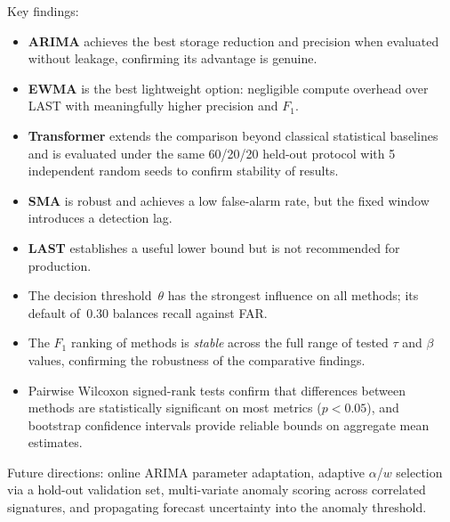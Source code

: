 \documentclass[11pt,a4paper]{article}
\begin{document}
Key findings:
\begin{itemize}
  \item \textbf{ARIMA} achieves the best storage reduction and precision
        when evaluated without leakage, confirming its advantage is genuine.
  \item \textbf{EWMA} is the best lightweight option: negligible compute
        overhead over LAST with meaningfully higher precision and $F_1$.
  \item \textbf{Transformer} extends the comparison beyond classical
        statistical baselines and is evaluated under the same 60/20/20
        held-out protocol with 5 independent random seeds to confirm
        stability of results.
  \item \textbf{SMA} is robust and achieves a low false-alarm rate, but
        the fixed window introduces a detection lag.
  \item \textbf{LAST} establishes a useful lower bound but is not
        recommended for production.
  \item The decision threshold~$\theta$ has the strongest influence on
        all methods; its default of~0.30 balances recall against FAR.
  \item The $F_1$ ranking of methods is \emph{stable} across the full
        range of tested $\tau$ and $\beta$ values, confirming the
        robustness of the comparative findings.
  \item Pairwise Wilcoxon signed-rank tests confirm that differences
        between methods are statistically significant on most metrics
        ($p < 0.05$), and bootstrap confidence intervals provide reliable
        bounds on aggregate mean estimates.
\end{itemize}

Future directions: online ARIMA parameter adaptation, adaptive $\alpha$/$w$
selection via a hold-out validation set, multi-variate anomaly scoring
across correlated signatures, and propagating forecast uncertainty into
the anomaly threshold.
\end{document}
